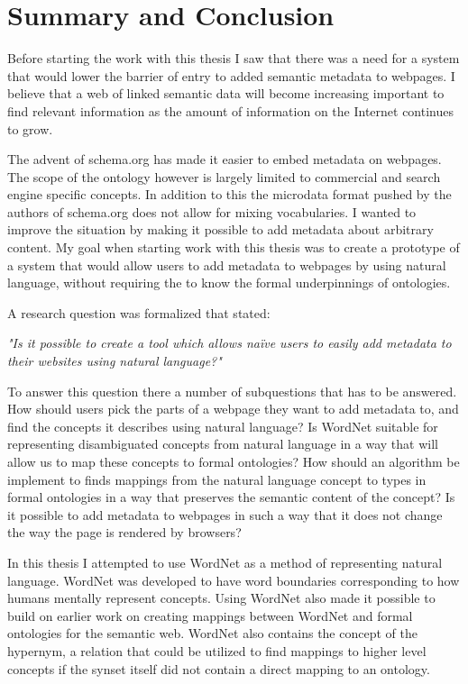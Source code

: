 
\chapter{Summary and Conclusion} %
\label{Conclusion} %
Before starting the work with this thesis I saw that there was a need for a system that would lower the barrier of
entry to added semantic metadata to webpages.
I believe that a web of linked semantic data will become increasing important to find relevant information as the amount
of information on the Internet continues to grow.

The advent of schema.org has made it easier to embed metadata on webpages.
The scope of the ontology however is largely limited to commercial and search engine specific concepts.
In addition to this the microdata format pushed by the authors of schema.org does not allow for mixing vocabularies.
I wanted to improve the situation by making it possible to add metadata about arbitrary content.
My goal when starting work with this thesis was to create a prototype of a system that would allow users to add metadata to webpages by using natural language,
without requiring the to know the formal underpinnings of ontologies.

A research question was formalized that stated:

\emph{"Is it possible to create a tool which allows naïve users to easily add metadata to their websites using natural language?"}

To answer this question there a number of subquestions that has to be answered.
How should users pick the parts of a webpage they want to add metadata to, and find the concepts it describes using natural language?
Is WordNet suitable for representing disambiguated concepts from natural language in a way that will allow us to map these concepts to formal ontologies?
How should an algorithm be implement to finds mappings from the natural language concept to types in
formal ontologies in a way that preserves the semantic content of the concept?
Is it possible to add metadata to webpages in such a way that it does not change the way the page is rendered by browsers?

In this thesis I attempted to use WordNet as a method of representing natural language.
WordNet was developed to have word boundaries corresponding to how humans mentally represent concepts.
Using WordNet also made it possible to  build on earlier work on creating mappings between WordNet and formal ontologies for the semantic web.
WordNet also contains the concept of the hypernym, a relation that could be utilized to find mappings to higher level concepts
if the synset itself did not contain a direct mapping to an ontology.

